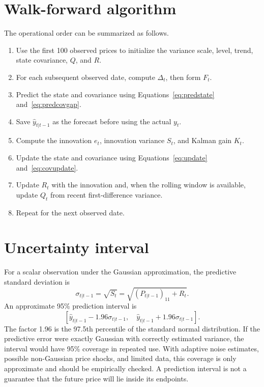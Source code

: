 \documentclass[12pt,a4paper,oneside]{report}
\numberwithin{equation}{chapter}
\numberwithin{figure}{chapter}
\numberwithin{table}{chapter}
\theoremstyle{definition}
\theoremstyle{plain}
\newcommand{\1}{\mathbf{1}}
\newcommand{\hatt}[1]{\widehat{#1}}
\begin{document}
\section{Walk-forward algorithm}
The operational order can be summarized as follows.
\begin{enumerate}
  \item Use the first 100 observed prices to initialize the variance scale, level, trend, state covariance, $Q$, and $R$.
  \item For each subsequent observed date, compute $\Delta_t$, then form $F_t$.
  \item Predict the state and covariance using Equations~\eqref{eq:predstate} and~\eqref{eq:predcovgap}.
  \item Save $\hatt{y}_{t|t-1}$ as the forecast before using the actual $y_t$.
  \item Compute the innovation $e_t$, innovation variance $S_t$, and Kalman gain $K_t$.
  \item Update the state and covariance using Equations~\eqref{eq:update} and~\eqref{eq:covupdate}.
  \item Update $R_t$ with the innovation and, when the rolling window is available, update $Q_t$ from recent first-difference variance.
  \item Repeat for the next observed date.
\end{enumerate}

\section{Uncertainty interval}
For a scalar observation under the Gaussian approximation, the predictive standard deviation is
\begin{equation}
  \sigma_{t|t-1}=\sqrt{S_t}=\sqrt{(P_{t|t-1})_{11}+R_t}.
\end{equation}
An approximate 95\% prediction interval is
\begin{equation}
  \left[\hatt{y}_{t|t-1}-1.96\sigma_{t|t-1},\quad
  \hatt{y}_{t|t-1}+1.96\sigma_{t|t-1}\right].
  \label{eq:interval}
\end{equation}
The factor 1.96 is the 97.5th percentile of the standard normal distribution. If the predictive error were exactly Gaussian with correctly estimated variance, the interval would have 95\% coverage in repeated use. With adaptive noise estimates, possible non-Gaussian price shocks, and limited data, this coverage is only approximate and should be empirically checked. A prediction interval is not a guarantee that the future price will lie inside its endpoints.
\end{document}
